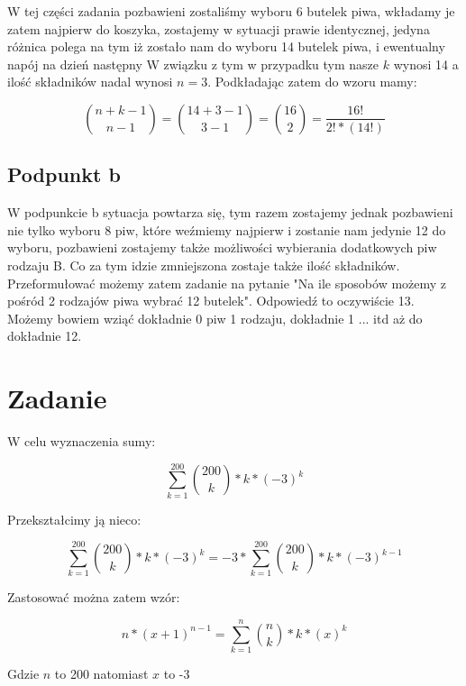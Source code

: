 \documentclass[paper=a4, fontsize=11pt]{scrartcl} %
\numberwithin{equation}{section} %
\numberwithin{figure}{section} %
\numberwithin{table}{section} %
\begin{document}
W tej części zadania pozbawieni zostaliśmy wyboru 6 butelek piwa, wkładamy je zatem
najpierw do koszyka, zostajemy w sytuacji prawie identycznej, jedyna różnica polega na tym
iż zostało nam do wyboru 14 butelek piwa, i ewentualny napój na dzień następny
W związku z tym w przypadku tym nasze \(k\) wynosi 14 a ilość składników nadal wynosi \(n = 3\). 
Podkładając zatem do wzoru mamy:

\begin{equation}
  { n + k - 1 \choose n - 1 } = {14 + 3 - 1 \choose 3 - 1} = { 16 \choose 2 } = \frac{16!}{2! * (14!)}
\end{equation}

\subsection{Podpunkt b}

W podpunkcie b sytuacja powtarza się, tym razem zostajemy jednak pozbawieni nie tylko wyboru 8 piw,
które weźmiemy najpierw i zostanie nam jedynie 12 do wyboru, pozbawieni zostajemy także możliwości
wybierania dodatkowych piw rodzaju B. Co za tym idzie zmniejszona zostaje także ilość składników.
Przeformułować możemy zatem zadanie na pytanie "Na ile sposobów możemy z pośród 2 rodzajów piwa wybrać
12 butelek". Odpowiedź to oczywiście 13. Możemy bowiem wziąć dokładnie 0 piw 1 rodzaju, dokładnie 1 ... itd
aż do dokładnie 12.
\newpage
\section{Zadanie}

W celu wyznaczenia sumy:

\begin{equation}
  \sum_{k=1}^{200}{200 \choose k} * k * (-3)^k
\end{equation}

Przekształcimy ją nieco:

\begin{equation}
  \sum_{k=1}^{200}{200 \choose k} * k * (-3)^k = -3 * \sum_{k=1}^{200}{200 \choose k} * k * (-3)^{k - 1}
\end{equation}

Zastosować można zatem wzór:

\begin{equation}
  n*(x+1)^{n-1} = \sum_{k=1}^{n} {n \choose k} * k * (x)^k
\end{equation}

Gdzie \(n\) to 200 natomiast \(x\) to -3
\end{document}
